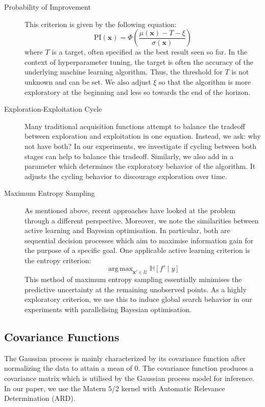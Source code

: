 \documentclass[letterpaper]{article}
\DeclareMathOperator*{\argmax}{arg\,max}
\begin{document}
\begin{description}
	\item[Probability of Improvement] This criterion is given by the following
	equation:
	$$\text{PI}(\textbf{x}) = \Phi\left( 
	\frac{\mu(\textbf{x})-T-\xi}{\sigma(\textbf{x})}\right)$$
	where $T$ is a target, often specified as the best result seen so far.
	In the context of hyperparameter tuning, the
	target is often the accuracy of the underlying machine learning algorithm. Thus,
	the threshold for $T$ is not unknown and can be set. We also adjust $\xi$ so
	that the algorithm is more exploratory at the beginning and less so towards the
	end of the horizon.
	
	\item[Exploration-Exploitation Cycle] Many traditional acquisition functions
	attempt to balance the tradeoff between exploration and exploitation in one
	equation. Instead, we ask: why not have both? In our experiments, we investigate
	if cycling between both stages can help to balance this tradeoff. Similarly, we
	also add in a parameter which determines the exploratory behavior of the algorithm.
	It adjusts the cycling behavior to discourage exploration over time.
	
	\item[Maximum Entropy Sampling] As mentioned above, recent approaches have looked
	at the problem through a different perspective. Moreover, we note the similarities
	between active learning and Bayesian optimisation. In particular, both are
	sequential decision processes which aim to maximise information gain for the
	purpose of a specific goal. One applicable active learning criterion is the
	entropy criterion:
	$$\argmax_{\textbf{x}'\in \mathcal{U}}{\mathbb{H}[f'\mid y]}$$
	This method of maximum entropy sampling essentially minimises the predictive
	uncertainty at the remaining unobserved points. As a highly exploratory criterion,
	we use this to induce global search behavior in our experiments with parallelising
	Bayesian optimisation.
\end{description}


\subsection{Covariance Functions}
The Gaussian process is mainly characterized by its covariance function after normalizing the data to attain a mean of 0. The covariance function produces a covariance matrix which is utilised by the Gaussian process model for inference.
In our paper, we use the Matern 5/2 kernel with Automatic Relevance Determination (ARD).
\end{document}
